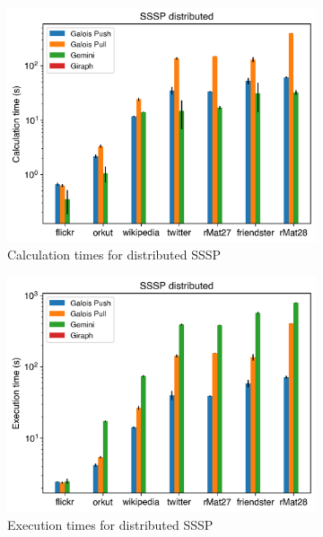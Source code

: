 \begin{figure}[t!]
	\begin{subfigure}{0.3\textwidth}
		\includegraphics[width=\linewidth]{../../plots/distributedSSSP_calcTime.png}
		\caption{Calculation times for distributed SSSP}
		\label{fig:distributedSSSP_calc}
	\end{subfigure}
	\hfil
	\begin{subfigure}{0.3\textwidth}
		\includegraphics[width=\linewidth]{../../plots/distributedSSSP_execTime.png}
		\caption{Execution times for distributed SSSP}
		\label{fig:distributedSSSP_exec}
	\end{subfigure}
	\hfil
	\begin{subfigure}{0.3\textwidth}

\end{subfigure}
\end{figure}
